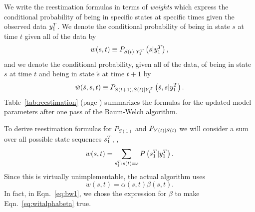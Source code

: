 We write the reestimation formulas in terms of \emph{weights} which
express the conditional probability of being in specific states at
specific times given the observed data $y_{1}^{T}$.  We denote the
conditional probability of being in state $s$ at time $t$ given all of
the data by
\begin{equation}
  \label{eq:wit}
  w(s,t) \equiv P_{{S}{(t)}|Y_{1}^{T}} \left(s|y_{1}^{T}
  \right),
\end{equation}
and we denote the conditional probability, given all of the data, of
being in state $s$ at time $t$ and being in state ${\tilde s}$ at time
$t+1$ by
\begin{equation}
  \label{eq:wijt}
  {\tilde w}({\tilde s},s,t) \equiv P_{{S}{(t+1)},{S}{(t)}|Y_{1}^{T}}
  \left({\tilde s},s|y_{1}^{T} \right).
\end{equation}
Table~\ref{tab:reestimation} (page \pageref{tab:reestimation})
summarizes the formulas for the updated model parameters after one
pass of the Baum-Welch algorithm.

To derive reestimation formulas for $P_{S(1)}$ and
$P_{{Y}{(t)}|{S}{(t)}}$ we will consider a sum over all possible
state sequences $s_{1}^{T}$, \ie,
\begin{equation}
  \label{eq:witFFE}
  w(s,t) = \sum_{s_{1}^{T}:{s}{(t)}=s}
  P \left(s_{1}^{T}|y_{1}^{T}
  \right).
\end{equation}
Since this is virtually unimplementable, the actual algorithm uses
\begin{equation}
  \label{eq:witalphabeta}
  w(s,t) = \alpha(s,t) \beta(s,t).
\end{equation}
In fact, in Eqn.~\eqref{eq:bw1}, we chose the expression for $\beta$
to make Eqn.~\eqref{eq:witalphabeta} true.

